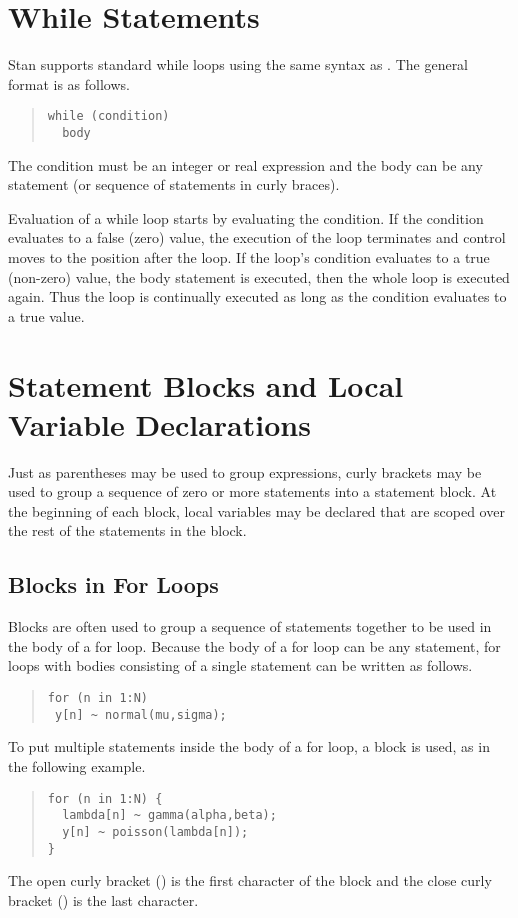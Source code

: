 \section{While Statements}

Stan supports standard while loops using the same syntax as \Cpp.  The
general format is as follows.
%
\begin{quote}
\begin{Verbatim}[fontsize=\small]
while (condition)
  body
\end{Verbatim}
\end{quote}
%
The condition must be an integer or real expression and the body can
be any statement (or sequence of statements in curly braces).  

Evaluation of a while loop starts by evaluating the condition.  If the
condition evaluates to a false (zero) value, the execution of the loop
terminates and control moves to the position after the loop.  If the
loop's condition evaluates to a true (non-zero) value, the body statement is
executed, then the whole loop is executed again.  Thus the loop is
continually executed as long as the condition evaluates to a true value.


\section{Statement Blocks and Local Variable Declarations}

Just as parentheses may be used to group expressions, curly brackets
may be used to group a sequence of zero or more statements into a
statement block.  At the beginning of each block, local variables may be
declared that are scoped over the rest of the statements in the block.

\subsection{Blocks in For Loops}

Blocks are often used to group a sequence of statements together to be
used in the body of a for loop.  Because the body of a for loop can be
any statement, for loops with bodies consisting of a single statement
can be written as follows.
%
\begin{quote}
\begin{Verbatim} 
for (n in 1:N) 
 y[n] ~ normal(mu,sigma);
\end{Verbatim}
\end{quote}
% 
To put multiple statements inside the body of a for loop, a block is
used, as in the following example.
%
\begin{quote}
\begin{Verbatim}[fontsize=\small]
for (n in 1:N) {
  lambda[n] ~ gamma(alpha,beta);
  y[n] ~ poisson(lambda[n]);
}
\end{Verbatim}
\end{quote}
%
The open curly bracket (\code{\{}) is the first character of the block
and the close curly bracket (\code{\}}) is the last character.

